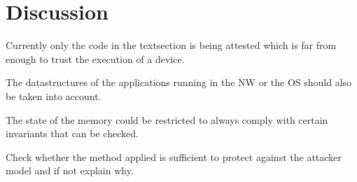 \documentclass{report}
\begin{document}
\chapter{Discussion}

Currently only the code in the textsection is being attested which is far from enough to trust the execution of a device.
\medskip

The datastructures of the applications running in the NW or the OS should also be taken into account.
\medskip

The state of the memory could be restricted to always comply with certain invariants that can be checked.
\medskip

Check whether the method applied is sufficient to protect against the attacker model and if not explain why.
\end{document}
